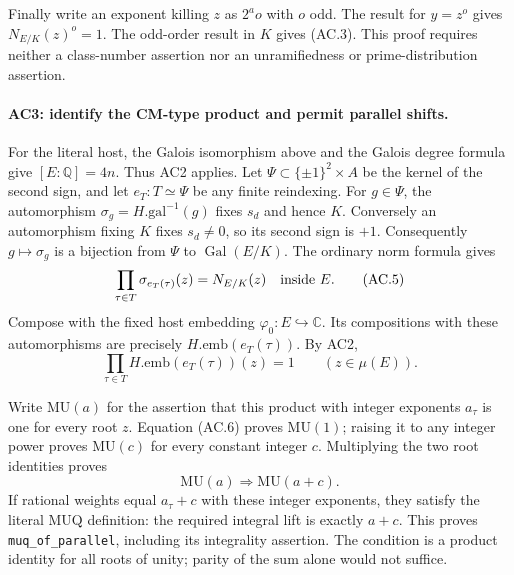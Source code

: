 Finally write an exponent killing $z$ as $2^a o$ with $o$ odd.
The result for $y=z^o$ gives $N_{E/K}(z)^o=1$.
The odd-order result in $K$ gives (AC.3).
This proof requires neither a class-number assertion nor an
unramifiedness or prime-distribution assertion.

\paragraph{AC3: identify the CM-type product and permit parallel shifts.}
For the literal host, the Galois isomorphism above and the Galois
degree formula give $[E:\mathbb Q]=4n$. Thus AC2 applies.
Let $\Psi\subset\{\pm1\}^2\times A$ be the kernel of the second
sign, and let $e_T:T\simeq\Psi$ be any finite reindexing.
For $g\in\Psi$, the automorphism $\sigma_g=H.\mathrm{gal}^{-1}(g)$
fixes $s_d$ and hence $K$. Conversely an automorphism fixing $K$
fixes $s_d\ne0$, so its second sign is $+1$.
Consequently $g\mapsto\sigma_g$ is a bijection from $\Psi$ to
$\operatorname{Gal}(E/K)$. The ordinary norm formula gives
\[
       \prod_{\tau\in T}\sigma_{e_T(\tau)}(z)=N_{E/K}(z)
                     \quad\hbox{inside }E.                  \tag{AC.5}
\]
Compose with the fixed host embedding $\varphi_0:E\hookrightarrow
\mathbb C$. Its compositions with these automorphisms are precisely
$H.\mathrm{emb}(e_T(\tau))$. By AC2,
\[
             \prod_{\tau\in T}H.\mathrm{emb}(e_T(\tau))(z)=1
                          \qquad(z\in\mu(E)).               \tag{AC.6}
\]

Write $\mathrm{MU}(a)$ for the assertion that this product with
integer exponents $a_\tau$ is one for every root $z$.
Equation (AC.6) proves $\mathrm{MU}(1)$; raising it to any integer
power proves $\mathrm{MU}(c)$ for every constant integer $c$.
Multiplying the two root identities proves
\[
                 \mathrm{MU}(a)\Longrightarrow
                      \mathrm{MU}(a+c).                     \tag{AC.7}
\]
If rational weights equal $a_\tau+c$ with these integer exponents,
they satisfy the literal $\mathrm{MUQ}$ definition: the required
integral lift is exactly $a+c$. This proves
\texttt{muq\_of\_parallel}, including its integrality assertion.
The condition is a product identity for all roots of unity; parity
of the sum alone would not suffice.

